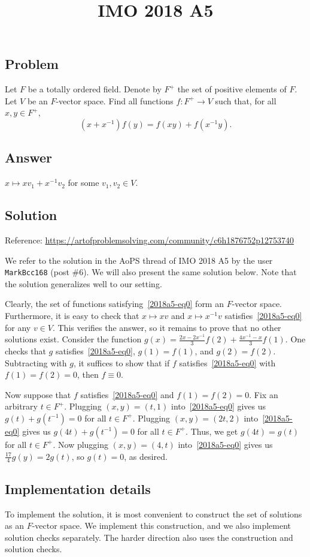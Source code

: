 \documentclass{article}
\title{IMO 2018 A5}
\author{}
\date{}
\begin{document}
\maketitle



\subsection*{Problem}

Let $F$ be a totally ordered field.
Denote by $F^+$ the set of positive elements of $F$.
Let $V$ be an $F$-vector space.
Find all functions $f : F^+ \to V$ such that, for all $x, y \in F^+$,
\[ (x + x^{-1}) f(y) = f(xy) + f(x^{-1} y). \tag{*}\label{2018a5-eq0} \]



\subsection*{Answer}

$x \mapsto x v_1 + x^{-1} v_2$ for some $v_1, v_2 \in V$.



\subsection*{Solution}

Reference: \url{https://artofproblemsolving.com/community/c6h1876752p12753740}

We refer to the solution in the AoPS thread of IMO 2018 A5 by the user \texttt{MarkBcc168} (post \#6).
We will also present the same solution below.
Note that the solution generalizes well to our setting.

Clearly, the set of functions satisfying~\eqref{2018a5-eq0} form an $F$-vector space.
Furthermore, it is easy to check that $x \mapsto xv$ and $x \mapsto x^{-1} v$ satisfies~\eqref{2018a5-eq0} for any $v \in V$.
This verifies the answer, so it remains to prove that no other solutions exist.
Consider the function $g(x) = \frac{2x - 2x^{-1}}{3} f(2) + \frac{4x^{-1} - x}{3} f(1)$.
One checks that $g$ satisfies~\eqref{2018a5-eq0}, $g(1) = f(1)$, and $g(2) = f(2)$.
Subtracting with $g$, it suffices to show that if $f$ satisfies~\eqref{2018a5-eq0} with $f(1) = f(2) = 0$, then $f \equiv 0$.

Now suppose that $f$ satisfies~\eqref{2018a5-eq0} and $f(1) = f(2) = 0$.
Fix an arbitrary $t \in F^+$.
Plugging $(x, y) = (t, 1)$ into~\eqref{2018a5-eq0} gives us $g(t) + g(t^{-1}) = 0$ for all $t \in F^+$.
Plugging $(x, y) = (2t, 2)$ into~\eqref{2018a5-eq0} gives us $g(4t) + g(t^{-1}) = 0$ for all $t \in F^+$.
Thus, we get $g(4t) = g(t)$ for all $t \in F^+$.
Now plugging $(x, y) = (4, t)$ into~\eqref{2018a5-eq0} gives us $\frac{17}{4} g(y) = 2 g(t)$, so $g(t) = 0$, as desired.




\subsection*{Implementation details}

To implement the solution, it is most convenient to construct the set of solutions as an $F$-vector space.
We implement this construction, and we also implement solution checks separately.
The harder direction also uses the construction and solution checks.
\end{document}

